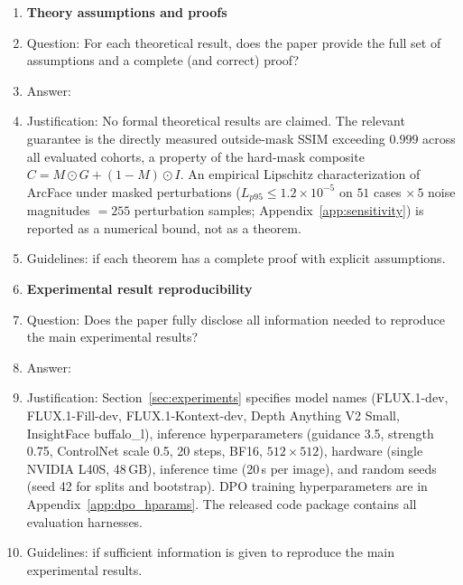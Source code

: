 \begin{enumerate}
\item {\bf Theory assumptions and proofs}
    \item[] Question: For each theoretical result, does the paper provide the full set of assumptions and a complete (and correct) proof?
    \item[] Answer: \answerNA{}
    \item[] Justification: No formal theoretical results are claimed. The relevant guarantee is the directly measured outside-mask SSIM exceeding $0.999$ across all evaluated cohorts, a property of the hard-mask composite $C = M \odot G + (1-M) \odot I$. An empirical Lipschitz characterization of ArcFace under masked perturbations ($L_{p95} \leq 1.2 \times 10^{-5}$ on $51$ cases $\times\,5$ noise magnitudes $=255$ perturbation samples; Appendix~\ref{app:sensitivity}) is reported as a numerical bound, not as a theorem.
    \item[] Guidelines: \answerYes{} if each theorem has a complete proof with explicit assumptions.

\item {\bf Experimental result reproducibility}
    \item[] Question: Does the paper fully disclose all information needed to reproduce the main experimental results?
    \item[] Answer: \answerYes{}
    \item[] Justification: Section~\ref{sec:experiments} specifies model names (FLUX.1-dev, FLUX.1-Fill-dev, FLUX.1-Kontext-dev, Depth Anything V2 Small, InsightFace buffalo\_l), inference hyperparameters (guidance 3.5, strength 0.75, ControlNet scale 0.5, 20 steps, BF16, $512{\times}512$), hardware (single NVIDIA L40S, 48\,GB), inference time (20\,s per image), and random seeds (seed 42 for splits and bootstrap). DPO training hyperparameters are in Appendix~\ref{app:dpo_hparams}. The released code package contains all evaluation harnesses.
    \item[] Guidelines: \answerYes{} if sufficient information is given to reproduce the main experimental results.


\end{enumerate}
